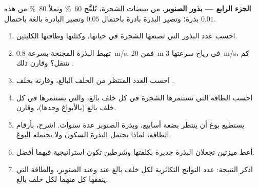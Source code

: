 \begin{problem}
\medskip
\noindent\textbf{الجزء الرابع --- بذور الصنوبر.}
من بييضات الشجرة، تُلقَّح \qty{60}{\%} وتملأ \qty{80}{\%} من هذه
بذرة؛ وتصير البذرة بادرة باحتمال $0.05$
وتصير البادرة بالغة باحتمال $0.01$.
\begin{enumerate}[resume]
  \item احسب عدد البذور التي تصنعها الشجرة في حياتها، وكتلتها
        وطاقتها الكليتين.
  \item تهبط البذرة المجنحة بسرعة \qty{0.8}{m/s}. فمن \qty{20}{m} في
        رياح سرعتها \qty{3}{m/s}، كم تنتقل؟ وقارن ذلك
        .
  \item احسب العدد المنتظر من الخلف البالغ، وقارنه بخلف .
  \item احسب الطاقة التي تستثمرها الشجرة في كل خلف بالغ، والتي
        يستثمرها  في كل خلف بالغ (بالأبواغ وحدها)، وقارن.
  \item يستطيع بوغ  أن ينتظر بضعة أسابيع، وبذرة الصنوبر عدة
        سنوات. اشرح، بأرقام الطاقة، لماذا تحتمل البذرة السكون ولا
        يحتمله البوغ.
  \item أعط ميزتين تجعلان البذرة جديرة بكلفتها وشرطين تكون
        استراتيجية  فيهما أفضل.
  \item اذكر النتيجة: عدد النواتج التكاثرية لكل خلف بالغ عند
         وعند الصنوبر، والطاقة التي ينفقها كل منهما لكل خلف
        بالغ.
\end{enumerate}
\end{problem}
